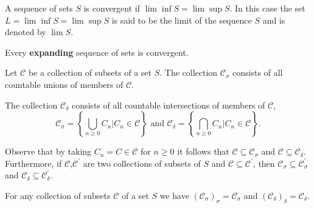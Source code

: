 \documentclass[../main.tex]{subfiles}
\begin{document}
\begin{purple}
\begin{definition}
    
A sequence of sets $S$ is convergent if $\lim\inf S=\lim\sup S$. In this case the set $L=\lim\inf S=\lim\sup S$ is said to be the limit of the sequence $S$ and is denoted by $\lim S$.
\end{definition}
\end{purple}

\begin{green}
    
Every \textbf{expanding} sequence of sets is convergent.

\end{green}


\begin{purple}
\begin{definition}

Let $\mathcal{C}$ be a collection of subsets of a set $S$. The collection $\mathcal{C}_{\sigma}$ consists of all countable unions of members of $\mathcal{C}$.

The  collection $\mathcal{C}_{\delta}$ consists of all countable intersections of members of $\mathcal{C}$,
$$
\mathcal{C}_{\sigma}=\left\{\bigcup_{n\ge0}C_n|C_n\in \mathcal{C}\right\} \text{ and } \mathcal{C}_{\delta}=\left\{\bigcap_{n\ge0}C_n|C_n\in\mathcal{C}\right\}.
$$
\end{definition}
\end{purple}

\begin{green}
    
Observe that by taking $C_n=C\in\mathcal{C}$ for $n\ge 0$ it follows that $\mathcal{C}\subseteq\mathcal{C}_{\sigma}$ and $\mathcal{C}\subseteq \mathcal{C}_{\delta}$. Furthermore, if $\mathcal{C}$,$\mathcal{C}^\prime$ are two collections of subsets of $S$ and $\mathcal{C}\subseteq \mathcal{C}^\prime$, then $\mathcal{C}_{\sigma}\subseteq \mathcal{C}_{\sigma}^\prime$ and $\mathcal{C}_{\delta}\subseteq \mathcal{C}^\prime_{\delta}$.

\end{green}


\begin{yellow}
\begin{theorem}

For any collection of subsets $\mathcal{C}$ of a set $S$ we have $(\mathcal{C}_\sigma)_{\sigma}=\mathcal{C}_{\sigma}$ and $(\mathcal{C}_{\delta})_{\delta}=\mathcal{C}_\delta$.

\end{theorem}
\end{yellow}
\end{document}

